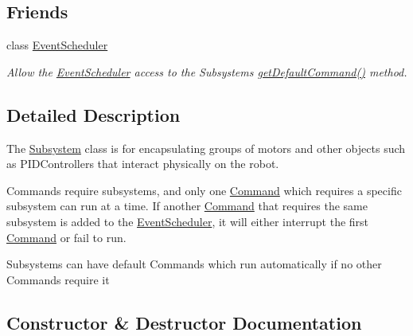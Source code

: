 \subsection*{Friends}
\begin{DoxyCompactItemize}
\item 
\mbox{\label{classlib_iterative_robot_1_1_subsystem_a2a47195be57876de9e0c9e18467a34a3}} 
class \mbox{\hyperlink{classlib_iterative_robot_1_1_subsystem_a2a47195be57876de9e0c9e18467a34a3}{Event\+Scheduler}}
\begin{DoxyCompactList}\small\item\em Allow the \mbox{\hyperlink{classlib_iterative_robot_1_1_event_scheduler}{Event\+Scheduler}} access to the Subsystems\textquotesingle{} \mbox{\hyperlink{classlib_iterative_robot_1_1_subsystem_a7e0c4904d9ff8ad2e4b6bc98d0f9579f}{get\+Default\+Command()}} method. \end{DoxyCompactList}\end{DoxyCompactItemize}


\subsection{Detailed Description}
The \mbox{\hyperlink{classlib_iterative_robot_1_1_subsystem}{Subsystem}} class is for encapsulating groups of motors and other objects such as P\+I\+D\+Controllers that interact physically on the robot.

Commands require subsystems, and only one \mbox{\hyperlink{classlib_iterative_robot_1_1_command}{Command}} which requires a specific subsystem can run at a time. If another \mbox{\hyperlink{classlib_iterative_robot_1_1_command}{Command}} that requires the same subsystem is added to the \mbox{\hyperlink{classlib_iterative_robot_1_1_event_scheduler}{Event\+Scheduler}}, it will either interrupt the first \mbox{\hyperlink{classlib_iterative_robot_1_1_command}{Command}} or fail to run.

Subsystems can have default Commands which run automatically if no other Commands require it 

\subsection{Constructor \& Destructor Documentation}
\mbox{\label{classlib_iterative_robot_1_1_subsystem_abdec44abe9ddba76f65abb02f8f62992}} 
